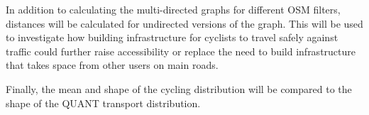In addition to calculating the multi-directed graphs for different OSM filters, distances will be calculated for undirected versions of the graph. This will be used to investigate how building infrastructure for cyclists to travel safely against traffic could further raise accessibility or replace the need to build infrastructure that takes space from other users on main roads. 

Finally, the mean and shape of the cycling distribution will be compared to the shape of the QUANT transport distribution.  
